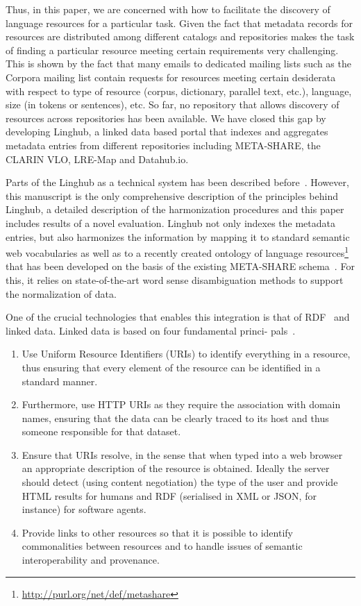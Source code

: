 \documentclass[smallextended]{svjour3}       %
\begin{document}
Thus, in this paper, we are concerned with how to facilitate the discovery of language
resources for a particular task. Given the fact that metadata records for
resources are distributed among different catalogs and repositories makes the
task of finding a particular resource meeting certain requirements very
challenging. This is shown by the fact that many emails to dedicated
mailing lists such as the Corpora mailing list contain requests for resources
meeting certain desiderata with respect to type of resource (corpus, dictionary,
parallel text, etc.), language, size (in tokens or sentences), etc.
So far, no repository that allows discovery of resources across repositories has
been available. We have closed this gap by developing Linghub, a linked data
based portal that indexes and aggregates metadata entries from different
repositories including META-SHARE, the CLARIN VLO, LRE-Map and Datahub.io.

Parts of the Linghub as a technical system has been described
before~\cite{mccrae2015reconciling,mccrae2015linghub}. 
 However, this manuscript is the only comprehensive description of the
 principles behind Linghub, a detailed description of the harmonization
 procedures and this paper includes results of a novel evaluation.
Linghub not
only indexes the metadata entries, but also harmonizes the information by
mapping it to standard semantic web vocabularies as well as to a recently created ontology of language resources\footnote{\url{http://purl.org/net/def/metashare}} that has been developed on the basis of the existing
META-SHARE schema~\cite{mccrae2015ontology}.
For this, it relies on state-of-the-art word sense disambiguation methods to
support the normalization of data. 

One of the crucial technologies that enables this integration is that of
RDF~\cite{klyne2006resource} and linked data. Linked data is based on four fundamental princi-
pals~\cite{bizer2009linked}.

\begin{enumerate}
    \item Use Uniform Resource Identifiers  (URIs) to identify everything in a resource, thus
        ensuring that every element of the resource can be identified in a standard
        manner.
    \item Furthermore, use HTTP URIs as they require the association with domain names,
        ensuring that the data can be clearly traced to its host and thus someone
        responsible for that dataset.
    \item Ensure that URIs resolve, in the sense that when typed into a web browser an
        appropriate description of the resource is obtained. Ideally the server should
        detect (using content negotiation) the type of the user and provide HTML
        results for humans and RDF (serialised in XML or JSON, for instance) for software agents.
    \item Provide links to other resources so that it is possible to identify
        commonalities between resources and to handle issues of semantic
        interoperability and provenance.
\end{enumerate}
\end{document}

